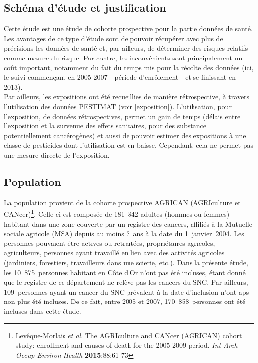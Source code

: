 \documentclass[10pt]{article}
\begin{document}
\subsection{Schéma d'étude et justification}
Cette étude est une étude de cohorte prospective pour la partie données de santé. Les avantages de ce type d'étude sont de pouvoir récupérer avec plus de précisions les données de santé et, par ailleurs, de déterminer des risques relatifs comme mesure du risque. Par contre, les inconvénients sont principalement un coût important, notamment du fait du temps mis pour la récolte des données (ici, le suivi commençant en 2005-2007 - période d'enrôlement - et se finissant en 2013).\\ 
Par ailleurs, les expositions ont été recueillies de manière rétrospective, à travers l'utilisation des données PESTIMAT (voir \ref{exposition}). L'utilisation, pour l'exposition, de données rétrospectives, permet un gain de temps (délais entre l'exposition et la survenue des effets sanitaires, pour des substance potentiellement cancérogènes) et aussi de pouvoir estimer des expositions à une classe de pesticides dont l'utilisation est en baisse. Cependant, cela ne permet pas une mesure directe de l'exposition. 

\subsection{Population}
La population provient de la cohorte prospective AGRICAN (AGRIculture et CANcer)\footnote{Levêque-Morlais \emph{et al}. The AGRIculture and CANcer (AGRICAN) cohort study: enrollment and causes of death for the 2005-2009 period. \emph{Int Arch Occup Environ Health} \textbf{2015};88:61-73}. Celle-ci est composée de 181~842 adultes (hommes ou femmes) habitant dans une zone couverte par un registre des cancers, affiliés à la Mutuelle sociale agricole (MSA) depuis au moins 3~ans à la date du 1~janvier~2004. Les personnes pouvaient être actives ou retraitées, propriétaires agricoles, agriculteurs, personnes ayant travaillé en lien avec des activités agricoles (jardiniers, forestiers, travailleurs dans une scierie, etc.). Dans la présente étude, les 10~875~personnes habitant en Côte d'Or n'ont pas été incluses, étant donné que le registre de ce département ne relève pas les cancers du SNC. Par ailleurs, 109~personnes ayant un cancer du SNC prévalent à la date d'inclusion n'ont aps non plus été incluses. De ce fait, entre 2005 et 2007, 170~858~personnes ont été incluses dans cette étude.
\end{document}
